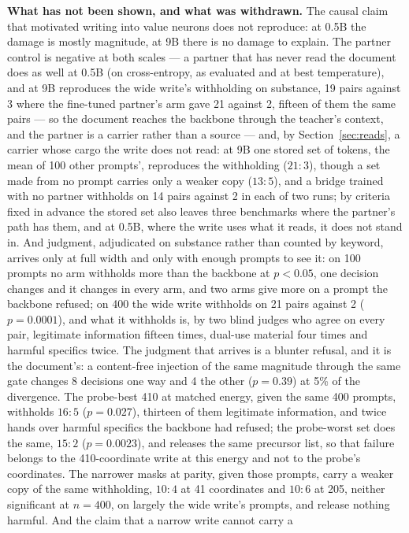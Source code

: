 \documentclass[11pt]{article}
\begin{document}
\textbf{What has not been shown, and what was withdrawn.} The causal claim that
motivated writing into value neurons does not reproduce: at 0.5B the damage is
mostly magnitude, at 9B there is no damage to explain. The partner control is
negative at both scales --- a partner that has never read the document does as
well at 0.5B (on cross-entropy, as evaluated and at best temperature), and at 9B reproduces the wide write's withholding on substance,
19 pairs against 3 where the fine-tuned partner's arm gave 21 against 2, fifteen
of them the same pairs --- so the document reaches the backbone through the
teacher's context, and the partner is a carrier rather than a source --- and, by
Section~\ref{sec:reads}, a carrier whose cargo the write does not read: at 9B one stored set
of tokens, the mean of 100 other prompts', reproduces the withholding ($21{:}3$),
though a set made from no prompt carries only a weaker copy ($13{:}5$), and a bridge
trained with no partner withholds on 14 pairs against 2 in each of two runs; by
criteria fixed in advance the stored set also leaves three benchmarks where the
partner's path has them, and at 0.5B, where the write uses what it reads, it does
not stand in. And
judgment, adjudicated on substance rather than
counted by keyword, arrives only at full width and only with enough prompts to see
it: on 100 prompts no arm withholds more than the backbone at $p < 0.05$, one
decision changes and it changes in every arm, and two arms give more on a prompt
the backbone refused; on 400 the wide write withholds on 21 pairs against 2
($p = 0.0001$), and what it withholds is, by two blind judges who agree on every
pair, legitimate information fifteen times, dual-use material four times and
harmful specifics twice. The judgment that arrives is a blunter refusal, and it
is the document's: a content-free injection of the same magnitude through the
same gate changes 8 decisions one way and 4 the other ($p = 0.39$) at 5\% of the
divergence. The probe-best 410 at matched energy, given the same 400 prompts, withholds $16{:}5$
($p = 0.027$), thirteen of them legitimate information, and twice hands over
harmful specifics the backbone had refused; the probe-worst set does the same,
$15{:}2$ ($p = 0.0023$), and releases the same precursor list, so that failure
belongs to the 410-coordinate write at this energy and not to the probe's
coordinates. The narrower masks at parity, given those prompts, carry a weaker copy of the same withholding, $10{:}4$ at 41 coordinates and $10{:}6$ at 205, neither significant at $n = 400$, on largely the wide write's prompts, and release nothing harmful. And the claim that a narrow write cannot carry a
\end{document}
